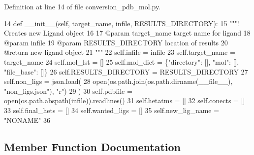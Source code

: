 Definition at line 14 of file conversion\+\_\+pdb\+\_\+mol.\+py.


\begin{DoxyCode}
14     \textcolor{keyword}{def }\_\_init\_\_(self, target\_name, infile, RESULTS\_DIRECTORY):
15         \textcolor{stringliteral}{"""! Creates new Ligand object}
16 \textcolor{stringliteral}{}
17 \textcolor{stringliteral}{        @param target\_name target name for ligand  }
18 \textcolor{stringliteral}{        @param infile }
19 \textcolor{stringliteral}{        @param RESULTS\_DIRECTORY location of results}
20 \textcolor{stringliteral}{        @return new ligand object}
21 \textcolor{stringliteral}{        """}
22         self.infile = infile
23         self.target\_name = target\_name
24         self.mol\_lst = []
25         self.mol\_dict = \{\textcolor{stringliteral}{"directory"}: [], \textcolor{stringliteral}{"mol"}: [], \textcolor{stringliteral}{"file\_base"}: []\}
26         self.RESULTS\_DIRECTORY = RESULTS\_DIRECTORY
27         self.non\_ligs = json.load(
28             open(os.path.join(os.path.dirname(\_\_file\_\_), \textcolor{stringliteral}{"non\_ligs.json"}), \textcolor{stringliteral}{"r")}
29 \textcolor{stringliteral}{        )}
30 \textcolor{stringliteral}{        self.pdbfile = open(os.path.abspath(infile)).readlines()}
31 \textcolor{stringliteral}{        self.hetatms = []}
32 \textcolor{stringliteral}{        self.conects = []}
33 \textcolor{stringliteral}{        self.final\_hets = []}
34 \textcolor{stringliteral}{        self.wanted\_ligs = []}
35 \textcolor{stringliteral}{        self.new\_lig\_name = "NONAME"}
36 
\end{DoxyCode}


\subsection{Member Function Documentation}
\mbox{\label{classfragalysis__api_1_1xcimporter_1_1conversion__pdb__mol_1_1_ligand_a58df3b55a6aca35511598a8d0e25ed6d}} 
